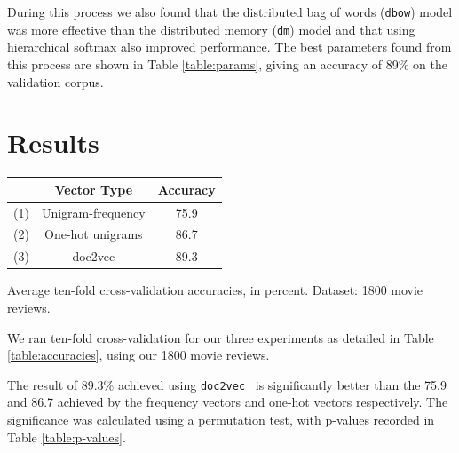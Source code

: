 \documentclass[12pt]{article}
\newcommand{\docvec}{\texttt{doc2vec}}
\begin{document}
\begin{multicols}{2}
During this process we also found that the distributed bag of words (\texttt{dbow}) model was more effective than the distributed memory (\texttt{dm}) model and that using hierarchical softmax also improved performance. The best parameters found from this process are shown in Table \ref{table:params}, giving an accuracy of 89\% on the validation corpus.

\section{Results}

\begin{tablehere}
\centering
 \begin{tabular}{| c | c | c|} 
 \hline
   & Vector Type & Accuracy \\ [0.5ex] 
 \hline\hline
 (1) & Unigram-frequency & 75.9\\ 
 \hline
 (2) & One-hot unigrams & 86.7 \\
 \hline
 (3) & doc2vec & 89.3 \\
 \hline
\end{tabular}
\caption{Average ten-fold cross-validation accuracies, in percent. Dataset: 1800 movie reviews.} \label{table:accuracies}
\end{tablehere}

We ran ten-fold cross-validation for our three experiments as detailed in Table \ref{table:accuracies}, using our 1800 movie reviews.

The result of 89.3\% achieved using \docvec~ is significantly better than the 75.9 and 86.7 achieved by the frequency vectors and one-hot vectors respectively. The significance was calculated using a permutation test, with p-values recorded in Table \ref{table:p-values}.


\end{multicols}
\end{document}
